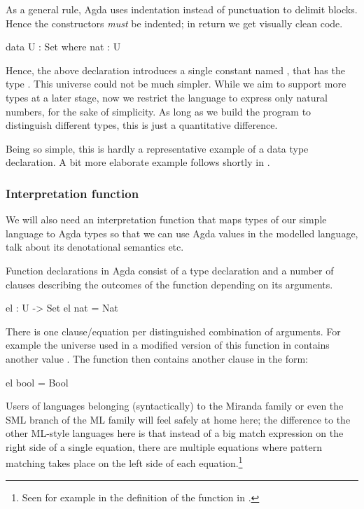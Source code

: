 As a general rule, Agda uses indentation instead of punctuation to delimit
blocks. Hence the constructors \emph{must} be indented; in return we get
visually clean code.

\begin{code}
  data U : Set where
    nat : U
\end{code}

\noindent Hence, the above declaration introduces a single constant named ,
that has the type . This universe could not be much simpler. While we aim to support more
types at a later stage, now we restrict the language to express only natural
numbers, for the sake of simplicity. As long as we build the program to
distinguish different types, this is just a quantitative difference.

Being so simple, this is hardly a representative example of a data type
declaration. A bit more elaborate example follows shortly in .

\subsubsection{Interpretation function}

We will also need an interpretation function that maps
types of our simple language to Agda types so that we can use Agda values in
the modelled language, talk about its denotational semantics etc.

Function declarations in Agda consist of a type declaration and a
number of clauses describing the outcomes of the function depending on
its arguments.

\begin{code}
  el : U -> Set
  el nat = Nat
\end{code}

\noindent There is one clause/equation per distinguished combination of arguments. For
example the universe  used in a modified version of this function in 
contains another value . The function  then contains another clause
in the form:
\begin{code}
  el bool = Bool
\end{code}
Users of languages belonging (syntactically) to the Miranda family or even the SML branch
of the ML family will feel safely at
home here; the difference to the other ML-style languages here is that instead of a big match
expression on the right side of a single equation, there are multiple equations where pattern
matching takes place on the left side of each equation.\footnote{Seen for example in
the definition of the function  in .}

